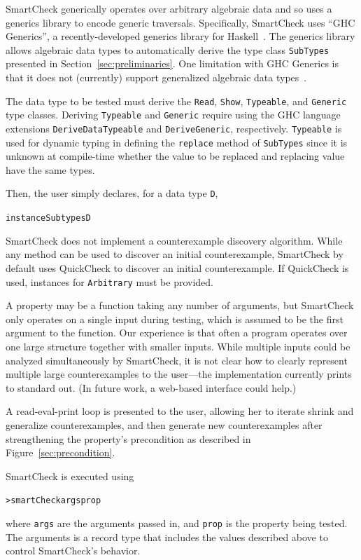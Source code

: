 \documentclass{sigplanconf}
\newenvironment{code}{\begin{alltt}}{\end{alltt}}
\newcommand{\ttp}[1]{\texttt{#1}}
\begin{document}
SmartCheck generically operates over arbitrary algebraic data and so uses a
generics library to encode generic traversals.  Specifically, SmartCheck uses
``GHC Generics'', a recently-developed generics library for
Haskell~\cite{generics}.  The generics library allows algebraic data types to
automatically derive the type class \ttp{SubTypes} presented in
Section~\ref{sec:preliminaries}.  One limitation with GHC Generics is that it
does not (currently) support generalized algebraic data types~\cite{gadts}.

The data type to be tested must derive the \ttp{Read}, \ttp{Show},
\ttp{Typeable}, and \ttp{Generic} type classes.  Deriving \ttp{Typeable} and
\ttp{Generic} require using the GHC language extensions \ttp{DeriveDataTypeable}
and \ttp{DeriveGeneric}, respectively.  \ttp{Typeable} is used for dynamic
typing in defining the \ttp{replace} method of \ttp{SubTypes} since it is
unknown at compile-time whether the value to be replaced and replacing value
have the same types.

Then, the user simply declares, for a data type \ttp{D},
%
\begin{code}
instance Subtypes D
\end{code}
%

SmartCheck does not implement a counterexample discovery algorithm.  While any
method can be used to discover an initial counterexample, SmartCheck by default
uses QuickCheck to discover an initial counterexample.  If QuickCheck is used,
instances for \ttp{Arbitrary} must be provided.

A property may be a function taking any number of arguments, but SmartCheck only
operates on a single input during testing, which is assumed to be the first
argument to the function.  Our experience is that often a program operates over
one large structure together with smaller inputs.  While multiple inputs could
be analyzed simultaneously by SmartCheck, it is not clear how to clearly
represent multiple large counterexamples to the user---the implementation
currently prints to standard out.  (In future work, a web-based interface could help.)

A read-eval-print loop is presented to the user, allowing her to iterate shrink
and generalize counterexamples, and then generate new counterexamples after
strengthening the property's precondition as described in
Figure~\ref{sec:precondition}.

SmartCheck is executed using
%
\begin{code}
> smartCheck args prop
\end{code}
%
\noindent
where \ttp{args} are the arguments passed in, and \ttp{prop} is the property
being tested.  The arguments is a record type that includes the values described
above to control SmartCheck's behavior.
\end{document}
